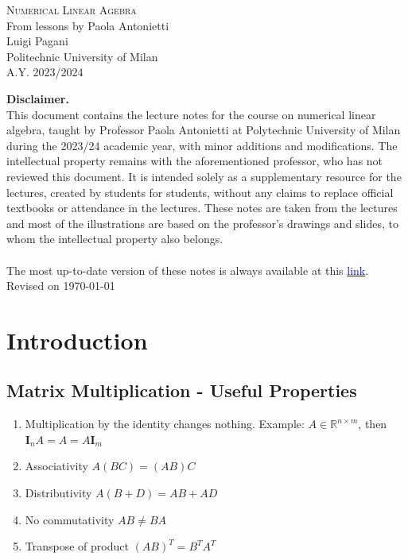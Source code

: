 \documentclass[11pt]{book}
\begin{document}
\begin{center}
	{\Huge \textsc{Numerical Linear Agebra}}\\
	\vspace*{1cm}
	{\large From lessons by Paola Antonietti}\\
	\vspace*{0.1cm}
	{\large {Luigi Pagani}}\\
	\vspace*{1cm}
	Politechnic University of Milan\\
	A.Y. 2023/2024
\end{center}




\vspace*{\fill}
\textbf{Disclaimer.} \\
This document contains the lecture notes for the course on numerical linear algebra, taught by Professor Paola Antonietti at Polytechnic University of Milan during the 2023/24 academic year, with minor additions and modifications.
The intellectual property remains with the aforementioned professor, who has not reviewed this document. It is intended solely as a supplementary resource for the lectures, created by students for students, without any claims to replace official textbooks or attendance in the lectures. These notes are taken from the lectures and most of the illustrations are based on the professor's drawings and slides, to whom the intellectual property also belongs. \\ \\
The most up-to-date version of these notes is always available at this \href{https://www.overleaf.com/read/yqysrsbvccht#946a7e2}{\textcolor{blue}{link}}. \\
Revised on \today \\ 


\vspace*{\fill}

\newpage

\tableofcontents

\chapter{Introduction}
\section*{Matrix Multiplication - Useful Properties}
\begin{enumerate}
  \item Multiplication by the identity changes nothing. Example: $A \in \mathbb{R}^{n \times m}$, then $\mathbf{I}_{n} A=A=A \mathbf{I}_{m}$

  \item Associativity $A(B C)=(A B) C$

  \item Distributivity $A(B+D)=A B+A D$

  \item No commutativity $A B \neq B A$

  \item Transpose of product $(A B)^{T}=B^{T} A^{T}$

\end{enumerate}
\end{document}
